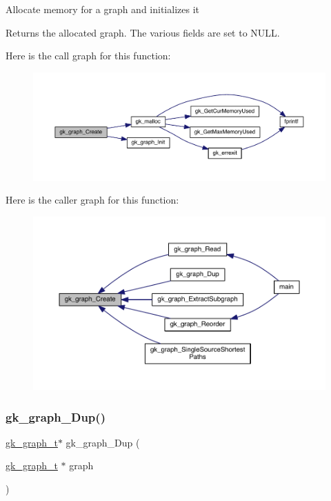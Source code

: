 Allocate memory for a graph and initializes it \begin{DoxyReturn}{Returns}
the allocated graph. The various fields are set to N\+U\+LL. 
\end{DoxyReturn}
Here is the call graph for this function\+:\nopagebreak
\begin{figure}[H]
\begin{center}
\leavevmode
\includegraphics[width=350pt]{a00846_a0d092a371d797437de53ae1a64bd78f4_cgraph}
\end{center}
\end{figure}
Here is the caller graph for this function\+:\nopagebreak
\begin{figure}[H]
\begin{center}
\leavevmode
\includegraphics[width=350pt]{a00846_a0d092a371d797437de53ae1a64bd78f4_icgraph}
\end{center}
\end{figure}
\mbox{\label{a00846_a24db906b45a9848fc26c49cb967d68c8}} 
\subsubsection{\texorpdfstring{gk\+\_\+graph\+\_\+\+Dup()}{gk\_graph\_Dup()}}
{\footnotesize\ttfamily \hyperlink{a00638}{gk\+\_\+graph\+\_\+t}$\ast$ gk\+\_\+graph\+\_\+\+Dup (\begin{DoxyParamCaption}\item[{\hyperlink{a00638}{gk\+\_\+graph\+\_\+t} $\ast$}]{graph }\end{DoxyParamCaption})}

